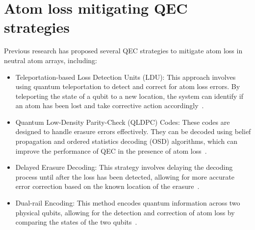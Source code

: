 \documentclass[aps,prb,twocolumn,superscriptaddress,nobibnotes]{revtex4-2} %
\begin{document}
\section{Atom loss mitigating QEC strategies}
Previous research has proposed several QEC strategies to mitigate atom loss in neutral atom arrays, including:
\begin{itemize}
    \item Teleportation-based Loss Detection Units (LDU): This approach involves using quantum teleportation to detect and correct for atom loss errors. By teleporting the state of a qubit to a new location, the system can identify if an atom has been lost and take corrective action accordingly~\cite{Perrin_2025}.
    \item Quantum Low-Density Parity-Check (QLDPC) Codes: These codes are designed to handle erasure errors effectively. They can be decoded using belief propagation and ordered statistics decoding (OSD) algorithms, which can improve the performance of QEC in the presence of atom loss~\cite{Roffe_2020}.
    \item Delayed Erasure Decoding: This strategy involves delaying the decoding process until after the loss has been detected, allowing for more accurate error correction based on the known location of the erasure~\cite{Chamberland_2022}.
    \item Dual-rail Encoding: This method encodes quantum information across two physical qubits, allowing for the detection and correction of atom loss by comparing the states of the two qubits~\cite{Chamberland_2022}.
\end{itemize}

\end{document}
